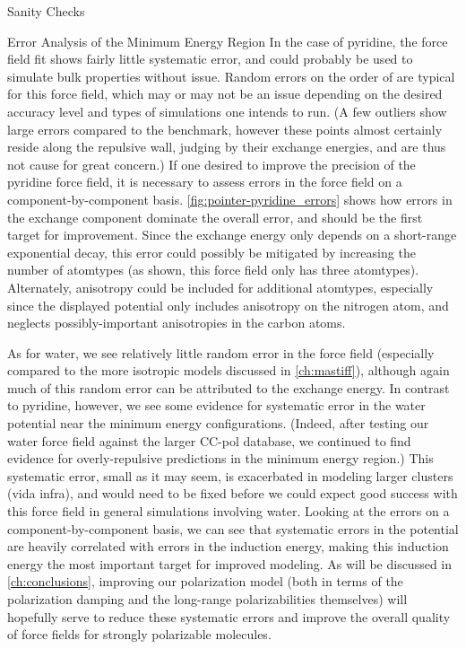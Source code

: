 \begin{subsection}{Sanity Checks}
\begin{paragraph}{Error Analysis of the Minimum Energy Region}
In the case of pyridine, the force field fit shows fairly little systematic
error, and could probably be used to simulate bulk properties without issue.
Random errors on the order of  are typical for this force
field, which may or may not be an issue depending on the desired accuracy
level and types of simulations one intends to run. 
(A few outliers show large errors compared to the
\sapt benchmark, however these points almost certainly reside along the
repulsive wall, judging by their exchange energies, and are thus not cause for
great concern.)
If one desired to improve
the precision of the pyridine force field, it is necessary to assess errors in
the force field on a component-by-component basis. \cref{fig:pointer-pyridine_errors}
shows how errors in the exchange component dominate the overall
error, and should be the first target for improvement. Since the exchange energy
only depends on a short-range exponential decay, this error could possibly be
mitigated by increasing the number of atomtypes (as shown, this force field
only has three atomtypes). Alternately, anisotropy could be included for additional atomtypes,
especially since the displayed potential only includes anisotropy on the nitrogen atom, and neglects
possibly-important anisotropies in the carbon atoms.

As for water, we see relatively little random error in the force field
(especially compared to the more isotropic models discussed in
\cref{ch:mastiff}), although again much of this random error can be attributed
to the exchange energy. In contrast to pyridine, however, we see some evidence
for systematic error in the water potential near the minimum energy
configurations. (Indeed, after testing our water force field against the
larger CC-pol database,\cite{Babin2013} we continued to find evidence for
overly-repulsive predictions in the minimum energy region.) This systematic
error, small as it may seem, is exacerbated in modeling larger clusters (vida
infra), and would need to be fixed before we could expect good success with
this force field in general simulations involving water. Looking at the errors on a
component-by-component basis, we can see that systematic errors in the potential
are heavily correlated with errors in the induction energy, making this
induction energy the most important target for improved modeling. As will be
discussed in \cref{ch:conclusions}, improving our polarization model (both in terms
of the polarization damping and the long-range polarizabilities themselves)
will hopefully serve to reduce these systematic errors and improve the overall
quality of force fields for strongly polarizable molecules.


\end{paragraph}
\end{subsection}
